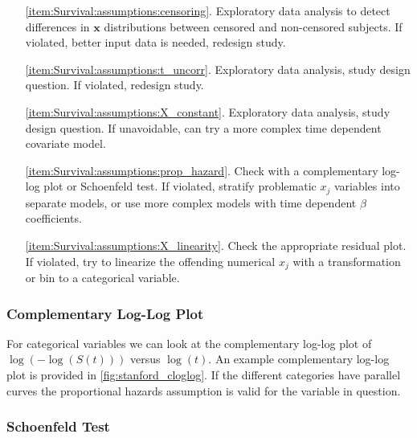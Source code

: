 \begin{itemize}[noitemsep]
\item[\cref{item:Survival:assumptions:censoring}.] Exploratory data analysis to detect differences in $\mathbf{x}$ distributions between censored and non-censored subjects. If violated, better input data is needed, redesign study.

\item[\cref{item:Survival:assumptions:t_uncorr}.] Exploratory data analysis, study design question. If violated, redesign study.

\item[\cref{item:Survival:assumptions:X_constant}.] Exploratory data analysis, study design question. If unavoidable, can try a more complex time dependent covariate model.

\item[\cref{item:Survival:assumptions:prop_hazard}.] Check with a complementary log-log plot or Schoenfeld test. If violated, stratify problematic $x_{j}$ variables into separate models, or use more complex models with time dependent $\beta$ coefficients.

\item[\cref{item:Survival:assumptions:X_linearity}.] Check the appropriate residual plot. If violated, try to linearize the offending numerical $x_{j}$ with a transformation or bin to a categorical variable.
\end{itemize}

\subsubsection{Complementary Log-Log Plot}
\label{additional:Survival:assumptions:cloglog}

For categorical variables we can look at the
complementary log-log plot
of $\log\left(-\log\left(S\left(t\right)\right)\right)$ versus $\log\left(t\right)$.
An example complementary log-log plot is provided in \cref{fig:stanford_cloglog}.
If the different categories have parallel curves
the proportional hazards assumption is
valid for the variable in question.

\subsubsection{Schoenfeld Test}
\label{additional:Survival:assumptions:schoenfeld}

